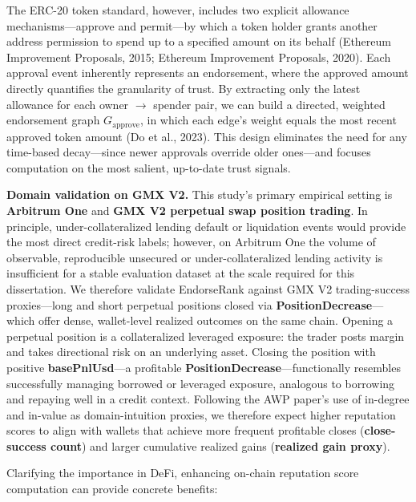 The ERC-20 token standard, however, includes two explicit allowance mechanisms---approve and permit---by which a token holder grants another address permission to spend up to a specified amount on its behalf (Ethereum Improvement Proposals, 2015; Ethereum Improvement Proposals, 2020). Each approval event inherently represents an endorsement, where the approved amount directly quantifies the granularity of trust. By extracting only the latest allowance for each owner \(\to\) spender pair, we can build a directed, weighted endorsement graph $G_{\text{approve}}$, in which each edge's weight equals the most recent approved token amount (Do et al., 2023). This design eliminates the need for any time-based decay---since newer approvals override older ones---and focuses computation on the most salient, up-to-date trust signals.


\textbf{Domain validation on GMX V2.} This study's primary empirical setting is \textbf{Arbitrum One} and \textbf{GMX V2 perpetual swap position trading}. In principle, under-collateralized lending default or liquidation events would provide the most direct credit-risk labels; however, on Arbitrum One the volume of observable, reproducible unsecured or under-collateralized lending activity is insufficient for a stable evaluation dataset at the scale required for this dissertation. We therefore validate EndorseRank against GMX V2 trading-success proxies---long and short perpetual positions closed via \textbf{PositionDecrease}---which offer dense, wallet-level realized outcomes on the same chain. Opening a perpetual position is a collateralized leveraged exposure: the trader posts margin and takes directional risk on an underlying asset. Closing the position with positive \textbf{basePnlUsd}---a profitable \textbf{PositionDecrease}---functionally resembles successfully managing borrowed or leveraged exposure, analogous to borrowing and repaying well in a credit context. Following the AWP paper's use of in-degree and in-value as domain-intuition proxies, we therefore expect higher reputation scores to align with wallets that achieve more frequent profitable closes (\textbf{close-success count}) and larger cumulative realized gains (\textbf{realized gain proxy}).


Clarifying the importance in DeFi, enhancing on-chain reputation score computation can provide concrete benefits:


